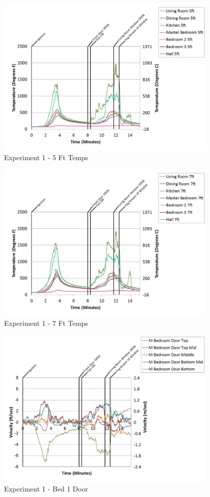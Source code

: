 \documentclass{article}
\begin{document}
\begin{appendices}
	\clearpage

	\begin{figure}[h!]
		\centering
		\includegraphics[height=3.05in]{0_Images/Results_Charts/Exp_1_Charts/5FtTemps.pdf}
		\caption{Experiment 1 - 5 Ft Temps}
	\end{figure}
 

	\begin{figure}[h!]
		\centering
		\includegraphics[height=3.05in]{0_Images/Results_Charts/Exp_1_Charts/7FtTemps.pdf}
		\caption{Experiment 1 - 7 Ft Temps}
	\end{figure}
 
	\clearpage

	\begin{figure}[h!]
		\centering
		\includegraphics[height=3.05in]{0_Images/Results_Charts/Exp_1_Charts/Bed1Door.pdf}
		\caption{Experiment 1 - Bed 1 Door}
	\end{figure}
 


\end{appendices}
\end{document}
